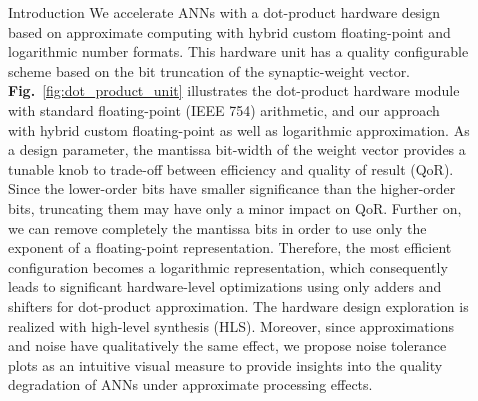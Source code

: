 \documentclass[final]{beamer}
\newlength{\sepwid}
\newlength{\onecolwid}
\newlength{\twocolwid}
\newcommand\fig[1]{\textbf{Fig.}~\ref{#1}}
\begin{document}
\begin{frame}[t]
\begin{columns}[t]
\begin{column}{\onecolwid}
\begin{block}{Introduction}
We accelerate ANNs with a dot-product hardware design based on approximate computing with hybrid custom floating-point and logarithmic number formats\cite{nevarez2021accelerating}. This hardware unit has a quality configurable scheme based on the bit truncation of the synaptic-weight vector. \fig{fig:dot_product_unit} illustrates the dot-product hardware module with standard floating-point (IEEE 754) arithmetic, and our approach with hybrid custom floating-point as well as logarithmic approximation. As a design parameter, the mantissa bit-width of the weight vector provides a tunable knob to trade-off between efficiency and quality of result (QoR)\cite{han2013approximate}. Since the lower-order bits have smaller significance than the higher-order bits, truncating them may have only a minor impact on QoR\cite{mittal2016survey}. Further on, we can remove completely the mantissa bits in order to use only the exponent of a floating-point representation. Therefore, the most efficient configuration becomes a logarithmic representation, which consequently leads to significant hardware-level optimizations using only adders and shifters for dot-product approximation. The hardware design exploration is realized with high-level synthesis (HLS). Moreover, since approximations and noise have qualitatively the same effect\cite{venkataramani2015approximate}, we propose noise tolerance plots as an intuitive visual measure to provide insights into the quality degradation of ANNs under approximate processing effects.


\end{block}

\end{column} %

\begin{column}{\sepwid}\end{column} %

\begin{column}{\twocolwid} %

\begin{columns}[t,totalwidth=\twocolwid] %

\begin{column}{\onecolwid}\vspace{-.6in} %



\end{column}
\end{columns}
\end{column}
\end{columns}
\end{frame}
\end{document}

